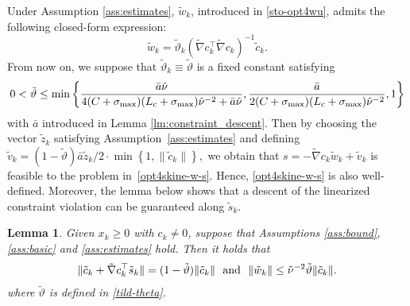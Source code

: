 \documentclass[11pt]{article}
\newtheorem{lemma}{Lemma}
\begin{document}
Under Assumption \ref{ass:estimates},  
$\tilde w_k$, introduced in \eqref{sto-opt4wu}, admits the following closed-form expression:
\begin{equation}\label{eq:wk-explicit}
    \tilde w_k = \tilde \vartheta_k 
    (\tilde \nabla c_k^\top \tilde \nabla c_k)^{-1} 
    \tilde c_k.
\end{equation}
From now on, we suppose that \(\tilde{\vartheta}_k\equiv \tilde\vartheta\) is a fixed constant satisfying
\begin{equation}\label{tild-theta}
0 < \tilde\vartheta \leq \min \left\{ \frac{\bar a \tilde{\nu}}{4 (C + \sigma_{\rm max}) (L_c + \sigma_{\rm max}) \tilde{\nu}^{-2} + \bar a \tilde{\nu}}, \frac{\bar a}{2 (C + \sigma_{\rm max}) (L_c + \sigma_{\rm max}) \tilde{\nu}^{-2}}, 1 \right\}
\end{equation}
with \(\bar a\) introduced in Lemma \ref{lm:constraint_descent}.
Then by choosing the  vector $\tilde z_k$ satisfying Assumption~\ref{ass:estimates} 
and defining
\(
    \tilde{v}_k = (1 - \tilde{\vartheta}) \bar{a} \tilde{z}_k / 2 \cdot \min \left\{ 1, \|\tilde{c}_k\| \right\},
\)
we obtain that 
\(
    s = -\tilde \nabla c_k \tilde w_k + \tilde v_k
\)
is feasible to the problem in~\eqref{opt4skine-w-s}. 
Hence, \eqref{opt4skine-w-s} is also well-defined. Moreover, the lemma below shows that %
 a descent of the linearized constraint violation can be guaranteed along $\tilde s_k$.
\begin{lemma}\label{up-w-s}
Given $x_k\ge0$ with $c_k\neq0$, 
suppose that Assumptions \ref{ass:bound}, \ref{ass:basic} and \ref{ass:estimates} hold. %
Then it holds that 
\begin{align}\label{cor:constraint_descent}
        \|\tilde c_k +\tilde \nabla c_k^\top \tilde s_k\| = (1-\tilde \vartheta)\|\tilde c_k\|~~{\rm and}~~\|\tilde w_k\|\leq \tilde \nu^{-2}\tilde \vartheta \|\tilde c_k\|.
    \end{align}
    where $\tilde \vartheta$ is defined in \eqref{tild-theta}. 
\end{lemma}
\end{document}
